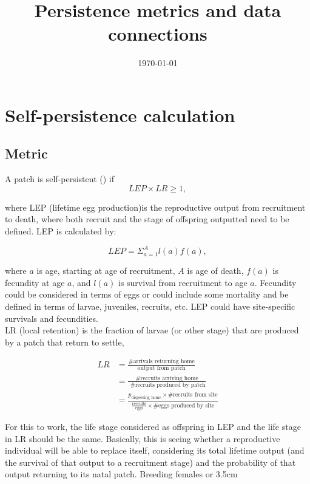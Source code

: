 \documentclass[12pt, oneside]{article}   	%
\title{Persistence metrics and data connections}
\begin{document}
\date{\today}
\maketitle{}
\section{Self-persistence calculation}
\subsection*{Metric}
A patch is self-persistent (\cite{burgess2014beyond}) if
\begin{equation}
LEP \times LR \geq 1,
\end{equation}

where LEP (lifetime egg production)is the reproductive output from recruitment to death, where both recruit and the stage of offspring outputted need to be defined. LEP is calculated by:

\begin{equation}
LEP = \Sigma_{a = 1}^{A} l(a)f(a),
\end{equation}{}

where $a$ is age, starting at age of recruitment, $A$ is age of death, $f(a)$ is fecundity at age $a$, and $l(a)$ is survival from recruitment to age $a$. Fecundity could be considered in terms of eggs or could include some mortality and be defined in terms of larvae, juveniles, recruits, etc. LEP could have site-specific survivals and fecundities.\\ %

LR (local retention) is the fraction of larvae (or other stage) that are produced by a patch that return to settle,

\begin{equation}
\begin{split}
LR & = \frac{\text{\# arrivals returning home}}{\text{output from patch}} \\
& = \frac{\text{\# recruits arriving home}}{\text{ \# recruits produced by patch}} \\
& = \frac{p_{\text{dispersing home}} \times \text{\# recruits from site}}{\frac{\text{recruits}}{\text{eggs}} \times \text{\# eggs produced by site}}
\end{split}
\end{equation}

For this to work, the life stage considered as offspring in LEP and the life stage in LR should be the same. Basically, this is seeing whether a reproductive individual will be able to replace itself, considering its total lifetime output (and the survival of that output to a recruitment stage) and the probability of that output returning to its natal patch. Breeding females or 3.5cm 
\end{document}
